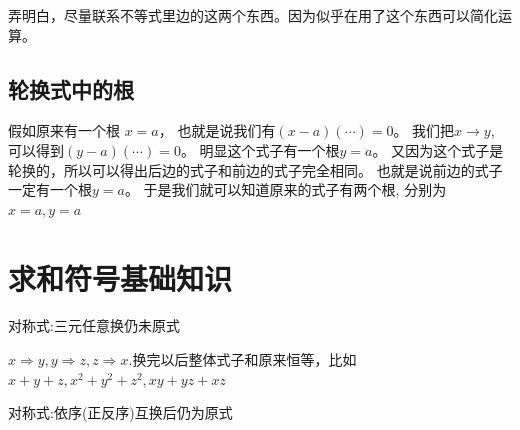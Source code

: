 弄明白，尽量联系不等式里边的这两个东西。因为似乎在用了这个东西可以简化运算。

\subsection{轮换式中的根}
假如原来有一个根 $x =a$， 也就是说我们有$(x-a)(\cdots)= 0$。 
我们把$x\to y$, 可以得到$(y-a) (\cdots )=0$。 明显这个式子有一个根$y =a$。 
又因为这个式子是轮换的，所以可以得出后边的式子和前边的式子完全相同。
也就是说前边的式子一定有一个根$y =a$。 于是我们就可以知道原来的式子有两个根,
分别为$x = a, y=a$

\section*{求和符号基础知识}
\textsf{对称式:}三元任意换仍未原式

$x\Rightarrow y, y\Rightarrow z, z\Rightarrow x$.换完以后整体式子和原来恒等，比如$x+y+z, x^2 + y^2 + z^2, xy + yz + xz$ 

\textsf{对称式:}依序(正反序)互换后仍为原式
\newpage

